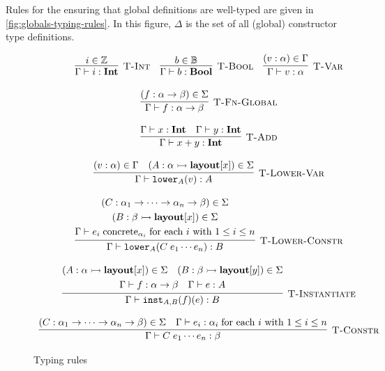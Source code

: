 Rules for the ensuring that global definitions are well-typed are
given in \autoref{fig:globals-typing-rules}. In this figure, $\Delta$
is the set of all (global) constructor type definitions.

\begin{figure}[t]
\[
\begin{array}{c}
  \labinfer[T-Int]{\Gamma \vdash i : \Int}
    {i \in \mathbb{Z}}
  ~~~
  \labinfer[T-Bool]{\Gamma \vdash b : \Bool}
    {b \in \mathbb{B}}
  ~~~
  \labinfer[T-Var]{\Gamma \vdash v : \alpha}
    {(v : \alpha) \in \Gamma}
  \\\\
  \labinfer[T-Fn-Global]{\Gamma \vdash f : \alpha \rightarrow \beta}
    {(f : \alpha \rightarrow \beta) \in \Sigma}
  \\\\
  \labinfer[T-Add]{\Gamma \vdash x + y : \Int}
    {\Gamma \vdash x : \Int & \Gamma \vdash y : \Int}
  \\\\
  \labinfer[T-Lower-Var]{\Gamma \vdash \lowerS{A}{v} : A}
    {(v : \alpha) \in \Gamma & (A : \alpha \monic \layout[x]) \in \Sigma}
  \\\\
  \labinfer[T-Lower-Constr]{\Gamma \vdash \lowerS{A}{C\; e_1 \cdots e_n} : B}
    {\begin{gathered}
      (C : \alpha_1 \rightarrow \cdots \rightarrow \alpha_n \rightarrow \beta) \in \Sigma
      \\ (B : \beta \monic \layout[x]) \in \Sigma
      \\  \Gamma \vdash e_i \concrete{\alpha_i}\; \textnormal{for each $i$ with $1 \le i \le n$}
     \end{gathered}
    }
  \\\\
  \labinfer[T-Instantiate]{\Gamma \vdash \instantiateS{A,B}{f}(e) : B}
    {\begin{gathered}
          (A : \alpha \monic \layout[x]) \in \Sigma
      ~~~ (B : \beta \monic \layout[y]) \in \Sigma
      \\  \Gamma \vdash f : \alpha \rightarrow \beta
      ~~~ \Gamma \vdash e : A
     \end{gathered}
    }
  \\\\
  \labinfer[T-Constr]{\Gamma \vdash C\; e_1 \cdots e_n : \beta}
    {(C : \alpha_1 \rightarrow \cdots \rightarrow \alpha_n \rightarrow \beta) \in \Sigma &
     \Gamma \vdash e_i : \alpha_i\; \textnormal{for each $i$ with $1 \le i \le n$}
    }
\end{array}
\]
  \caption{Typing rules}
  \label{fig:typing-rules}
\end{figure}



